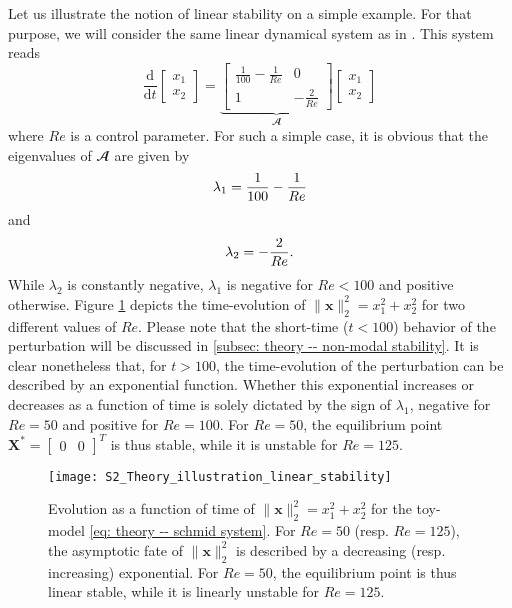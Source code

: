   Let us illustrate the notion of linear stability on a simple example. For that purpose, we will consider the same linear dynamical system as in \cite{amr:schmid:2014}. This system reads
  \begin{equation}
    \displaystyle \frac{\mathrm{d}}{\mathrm{d}t} \begin{bmatrix} x_1 \\ x_2 \end{bmatrix} =
    \underbrace{
    \begin{bmatrix}
      \displaystyle \frac{1}{100} - \frac{1}{Re} & 0 \\
      1 & \displaystyle -\frac{2}{Re}
    \end{bmatrix}
    }_{\mathbfcal{A}}
    \begin{bmatrix} x_1 \\ x_2 \end{bmatrix}
    \label{eq: theory -- schmid system}
  \end{equation}
  where $Re$ is a control parameter. For such a simple case, it is obvious that the eigenvalues of $\mathbfcal{A}$ are given by
  \begin{equation}
    \lambda_1 = \displaystyle \frac{1}{100} - \frac{1}{Re}
    \notag
  \end{equation}
  and
  \begin{equation}
    \lambda_2 = - \frac{2}{Re}.
    \notag
  \end{equation}
  While $\lambda_2$ is constantly negative, $\lambda_1$ is negative for $Re < 100$ and positive otherwise. Figure \ref{fig: theory -- illustration modal stability} depicts the time-evolution of $\| \mathbf{x} \|_2^2 = x_1^2 + x_2^2$ for two different values of $Re$. Please note that the short-time ($t < 100$) behavior of the perturbation will be discussed in \textsection \ref{subsec: theory -- non-modal stability}. It is clear nonetheless that, for $t>100$, the time-evolution of the perturbation can be described by an exponential function. Whether this exponential increases or decreases as a function of time is solely dictated by the sign of $\lambda_1$, negative for $Re=50$ and positive for $Re=100$. For $Re=50$, the equilibrium point $\mathbf{X}^* = \begin{bmatrix} 0 & 0 \end{bmatrix}^T$ is thus stable, while it is unstable for $Re=125$.

  \begin{figure}[b]
    \centering
    \sidecaption
    \texttt{[image: S2\_Theory\_illustration\_linear\_stability]}
    \caption{Evolution as a function of time of $\| \mathbf{x} \|_2^2 = x_1^2 + x_2^2$ for the toy-model \eqref{eq: theory -- schmid system}. For $Re=50$ (resp. $Re=125$), the asymptotic fate of $\| \mathbf{x} \|_2^2$ is described by a decreasing (resp. increasing) exponential. For $Re=50$, the equilibrium point is thus linear stable, while it is linearly unstable for $Re=125$.}
    \label{fig: theory -- illustration modal stability}
  \end{figure}

